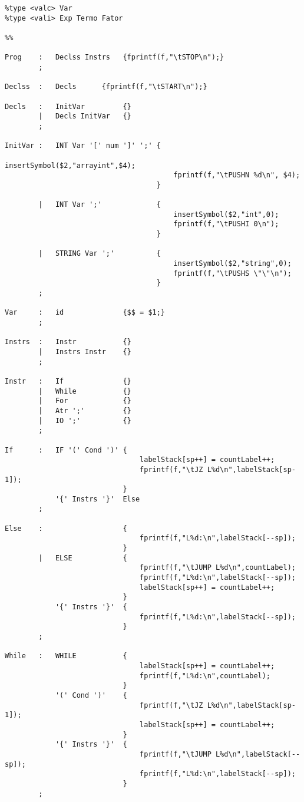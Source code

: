 \documentclass{report}
\begin{document}
\begin{verbatim}
%type <valc> Var
%type <vali> Exp Termo Fator

%%

Prog    :   Declss Instrs   {fprintf(f,"\tSTOP\n");}
        ;

Declss  :   Decls      {fprintf(f,"\tSTART\n");}

Decls   :   InitVar         {}
        |   Decls InitVar   {}
        ;

InitVar :   INT Var '[' num ']' ';' {
                                        insertSymbol($2,"arrayint",$4);
                                        fprintf(f,"\tPUSHN %d\n", $4);
                                    }
                                        
        |   INT Var ';'             {
                                        insertSymbol($2,"int",0);
                                        fprintf(f,"\tPUSHI 0\n");
                                    }

        |   STRING Var ';'          {
                                        insertSymbol($2,"string",0);
                                        fprintf(f,"\tPUSHS \"\"\n");
                                    }
        ;

Var     :   id              {$$ = $1;}
        ;

Instrs  :   Instr           {}
        |   Instrs Instr    {}
        ;    

Instr   :   If              {}
        |   While           {}
        |   For             {}
        |   Atr ';'         {}
        |   IO ';'          {}
        ;

If      :   IF '(' Cond ')' {
                                labelStack[sp++] = countLabel++;
                                fprintf(f,"\tJZ L%d\n",labelStack[sp-1]);
                            }
            '{' Instrs '}'  Else
        ;

Else    :                   {    
                                fprintf(f,"L%d:\n",labelStack[--sp]);
                            }
        |   ELSE            {
                                fprintf(f,"\tJUMP L%d\n",countLabel);
                                fprintf(f,"L%d:\n",labelStack[--sp]);
                                labelStack[sp++] = countLabel++;
                            } 
            '{' Instrs '}'  {
                                fprintf(f,"L%d:\n",labelStack[--sp]);
                            }
        ;

While   :   WHILE           {
                                labelStack[sp++] = countLabel++;
                                fprintf(f,"L%d:\n",countLabel);
                            }
            '(' Cond ')'    {
                                fprintf(f,"\tJZ L%d\n",labelStack[sp-1]);
                                labelStack[sp++] = countLabel++;
                            }
            '{' Instrs '}'  {
                                fprintf(f,"\tJUMP L%d\n",labelStack[--sp]);
                                fprintf(f,"L%d:\n",labelStack[--sp]);
                            }
        ;


\end{verbatim}
\end{document}
